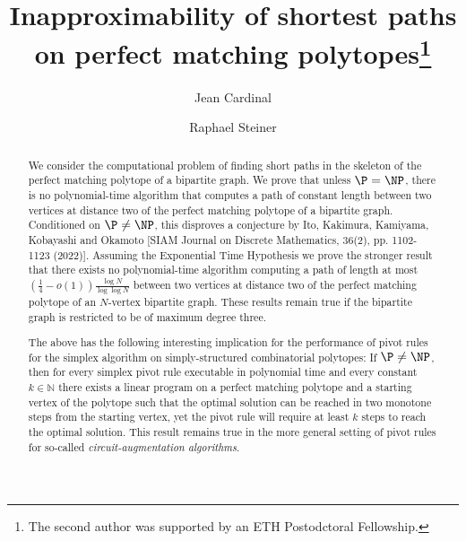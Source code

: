\documentclass[runningheads]{llncs}
\begin{document}
%
\title{Inapproximability of shortest paths on perfect matching polytopes\thanks{The second author was supported by an ETH Postodctoral Fellowship.}}
%
%
\author{Jean Cardinal \and
Raphael Steiner}
%
%
%
\maketitle              %
%
\begin{abstract}
We consider the computational problem of finding short paths in the skeleton of the perfect matching polytope of a bipartite graph. We prove that unless $\P=\NP$, there is no polynomial-time algorithm that computes a path of constant length between two vertices at distance two of the perfect matching polytope of a bipartite graph. Conditioned on $\P\neq\NP$, this disproves a conjecture by Ito, Kakimura, Kamiyama, Kobayashi and Okamoto [SIAM Journal on Discrete Mathematics, 36(2), pp. 1102-1123 (2022)]. Assuming the Exponential Time Hypothesis we prove the stronger result that there exists no polynomial-time algorithm computing a path of length at most $\left(\frac{1}{4}-o(1)\right)\frac{\log N}{\log \log N}$ between two vertices at distance two of the perfect matching polytope of an $N$-vertex bipartite graph. These results remain true if the bipartite graph is restricted to be of maximum degree three. 

The above has the following interesting implication for the performance of pivot rules for the simplex algorithm on simply-structured combinatorial polytopes: If $\P\neq\NP$, then for every simplex pivot rule executable in polynomial time and every constant $k \in \mathbb{N}$ there exists a linear program on a perfect matching polytope and a starting vertex of the polytope such that the optimal solution can be reached in two monotone steps from the starting vertex, yet the pivot rule will require at least $k$ steps to reach the optimal solution. This result remains true in the more general setting of pivot rules for so-called \emph{circuit-augmentation algorithms}.

\end{abstract}
\end{document}
